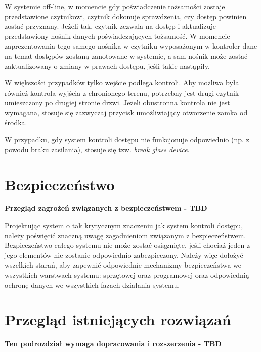 		W systemie off-line, w momencie gdy poświadczenie tożsamości zostaje przedstawione czytnikowi, czytnik dokonuje sprawdzenia, czy dostęp powinien zostać przyznany. Jeżeli tak, czytnik zezwala na dostęp i aktualizuje przedstawiony nośnik danych poświadczających tożsamość. W momencie zaprezentowania tego samego nośnika w czytniku wyposażonym w kontroler dane na temat dostępów zostaną zanotowane w systemie, a sam nośnik może zostać zaktualizowany o zmiany w prawach dostępu, jeśli takie nastąpiły.

		W większości przypadków tylko wejście podlega kontroli. Aby możliwa była również kontrola wyjścia z chronionego terenu, potrzebny jest drugi czytnik umieszczony po drugiej stronie drzwi. Jeżeli obustronna kontrola nie jest wymagana, stosuje się zazwyczaj przycisk umożliwiający otworzenie zamka od środka.

		W przypadku, gdy system kontroli dostępu nie funkcjonuje odpowiednio (np. z powodu braku zasilania), stosuje się tzw. \textit{break glass device}.

	\section{Bezpieczeństwo}
		\textbf{Przegląd zagrożeń związanych z bezpieczeństwem - TBD}

		Projektując system o tak krytycznym znaczeniu jak system kontroli dostępu, należy poświęcić znaczną uwagę zagadnieniom związanym z bezpieczeństwem. Bezpieczeństwo całego systemu nie może zostać osiągnięte, jeśli chociaż jeden z jego elementów nie zostanie odpowiednio zabezpieczony. Należy więc dołożyć wszelkich starań, aby zapewnić odpowiednie mechanizmy bezpieczeństwa we wszystkich warstwach systemu: sprzętowej oraz programowej oraz odpowiednią ochronę danych we wszystkich fazach działania systemu.

	\section{Przegląd istniejących rozwiązań}
		\textbf{Ten podrozdział wymaga dopracowania i rozszerzenia - TBD}

